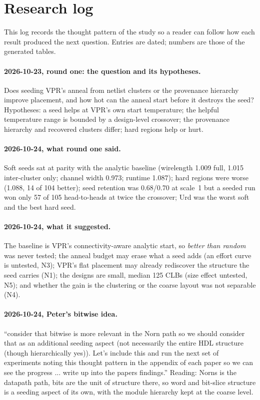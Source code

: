 \appendix
\section{Research log}
\label{sec:r2-appendix}

This log records the thought pattern of the study so a reader can follow how each result
produced the next question. Entries are dated; numbers are those of the generated tables.

\paragraph{2026-10-23, round one: the question and its hypotheses.} Does seeding VPR's anneal from
netlist clusters or the provenance hierarchy improve placement, and how hot can the anneal start before it
destroys the seed? Hypotheses: a seed helps at VPR's own start temperature; the helpful temperature range
is bounded by a design-level crossover; the provenance hierarchy and recovered clusters differ; hard regions help or hurt.

\paragraph{2026-10-24, what round one said.} Soft seeds sat at parity with the analytic baseline
(wirelength 1.009 full, 1.015 inter-cluster only; channel width 0.973; runtime 1.087); hard regions were worse
(1.088, 14 of 104 better); seed retention was 0.68/0.70 at scale~1 but a seeded run won only 57 of 105 head-to-heads at twice the
crossover; Urd was the worst soft and the best hard seed.

\paragraph{2026-10-24, what it suggested.} The baseline is VPR's connectivity-aware analytic
start, so \emph{better than random} was never tested; the anneal budget may erase what a seed adds (an
effort curve is untested, N3); VPR's flat placement may already rediscover the structure the seed carries (N1); the
designs are small, median 125 CLBs (size effect untested, N5); and whether the gain is the clustering or the coarse
layout was not separable (N4).

\paragraph{2026-10-24, Peter's bitwise idea.} ``consider that bitwise is more relevant in the Norn path so we should consider that as an additional seeding aspect (not necessarily the entire HDL structure (though hierarchically yes)). Let's include this and run the next set of experiments noting this thought pattern in the appendix of each paper so we can see the progress ... write up into the papers findings.''
Reading: Norns is the datapath path, bits are the unit of structure there, so word and bit-slice
structure is a seeding aspect of its own, with the module hierarchy kept at the coarse level.

